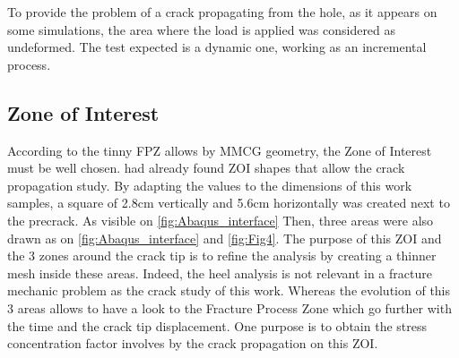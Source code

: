 To provide the problem of a crack propagating from the hole, as it appears on some simulations, the area where the load is applied was considered as undeformed. The test expected is a dynamic one, working as an incremental process.


\subsection{Zone of Interest }
According to the tinny FPZ allows by MMCG geometry, the Zone of Interest must be well chosen. \parencite{Reference7} had already found ZOI shapes that allow the crack propagation study. By adapting the values to the dimensions of this work samples, a square of 2.8\si{\centi\meter} vertically and 5.6\si{\centi\meter} horizontally was created next to the precrack. As visible on \ref{fig:Abaqus_interface}
Then, three areas were also drawn as on \ref{fig:Abaqus_interface} and \ref{fig:Fig4}. The purpose of this ZOI and the 3 zones around the crack tip is to refine the analysis by creating a thinner mesh inside these areas. Indeed, the heel analysis is not relevant in a fracture mechanic problem as the crack study of this work. Whereas the evolution of this 3 areas allows to have a look to the Fracture Process Zone which go further with the time and the crack tip displacement.
One purpose is to obtain the stress concentration factor involves by the crack propagation on this ZOI.


